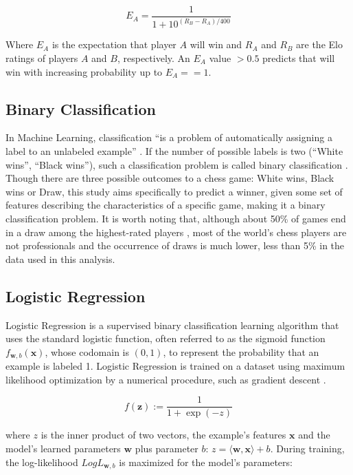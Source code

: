 \documentclass[12pt]{article}
\begin{document}
\[
E_A = \frac{1}{1 + 10^{(R_B - R_A)/400}}
\]

Where $E_A$ is the expectation that player $A$ will win and $R_A$ and $R_B$ are the Elo ratings of players $A$ and $B$, respectively. An $E_A$ value $> 0.5$ predicts that will win with increasing probability up to $E_A == 1$.

\subsection{Binary Classification}

In Machine Learning, classification ``is a problem of automatically assigning a label to an unlabeled example'' \cite[Chapter 2, Section 2.7]{100MLB}. If the number of possible labels is two (``White wins'', ``Black wins''), such a classification problem is called binary classification \cite{Allwein2000}. Though there are three possible outcomes to a chess game: White wins, Black wins or Draw, this study aims specifically to predict a winner, given some set of features describing the characteristics of a specific game, making it a binary classification problem. It is worth noting that, although about 50\% of games end in a draw among the highest-rated players \cite{chessBaseDraws}, most of the world's chess players are not professionals and the occurrence of draws is much lower, less than 5\% in the data used in this analysis.

\subsection{Logistic Regression}

Logistic Regression is a supervised binary classification learning algorithm that uses the standard logistic function, often referred to as the sigmoid function $f_{\textbf{w},b}(\textbf{x})$, whose codomain is $(0, 1)$, to represent the probability that an example is labeled 1. Logistic Regression is trained on a dataset using maximum likelihood optimization by a numerical procedure, such as gradient descent \cite[Chapter 9, Section 9.3]{ShalevShwartz2014}.

\[
f(\textbf{z}) := \frac{1}{1 + \exp(-z)}
\]

where $z$ is the inner product of two vectors, the example's features $\textbf{x}$ and the model's learned parameters $\textbf{w}$ plus parameter $b$: $z = \langle\textbf{w}, \textbf{x}\rangle + b$. During training, the log-likelihood $LogL_{\textbf{w},b}$ is maximized for the model's parameters:
\end{document}
